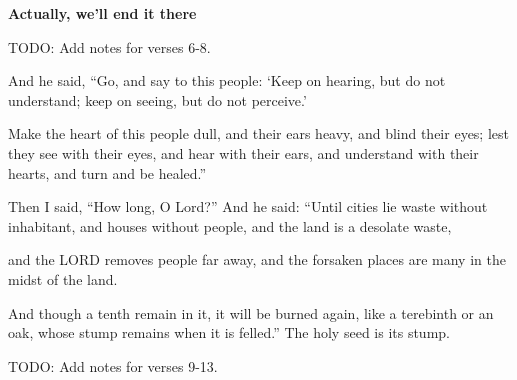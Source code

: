 \documentclass[11pt]{article}
\begin{document}
{\large\bfseries Actually, we'll end it there}
{\vspace{1em}}

TODO: Add notes for verses 6-8.

\begin{biblicaloutline}[Isaiah 6:9-13]
    

    \begin{versesection}{2em}
         And he said, ``Go, and say to this people: `Keep on hearing, but do not understand; keep on seeing, but do not perceive.'

         Make the heart of this people dull, and their ears heavy, and blind their eyes; lest they see with their eyes, and hear with their ears, and understand with their hearts, and turn and be healed.''
    \end{versesection}
    
    
    \begin{versesection}{2em}
         Then I said, ``How long, O Lord?'' And he said: ``Until cities lie waste without inhabitant, and houses without people, and the land is a desolate waste,

         and the LORD removes people far away, and the forsaken places are many in the midst of the land.

         And though a tenth remain in it, it will be burned again, like a terebinth or an oak, whose stump remains when it is felled.'' The holy seed is its stump.
    \end{versesection}

\end{biblicaloutline}

{\vspace{2em}}
TODO: Add notes for verses 9-13.
\end{document}
